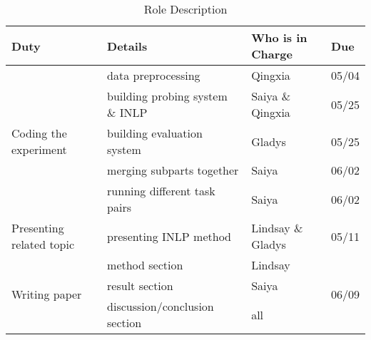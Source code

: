 \documentclass[11pt,a4paper]{article}
\begin{document}
\begin{table*}[h]
    \centering
    \begin{tabular}{llll}
    \hline
    \textbf{Duty} & \textbf{Details} & \textbf{Who is in Charge} &\textbf{Due} \\
    \hline
    \multirow{5}{*}{Coding the experiment} & data preprocessing & Qingxia & 05/04 \\
    & building probing system \& INLP & Saiya \& Qingxia & 05/25 \\
    & building evaluation system & Gladys & 05/25 \\
    & merging subparts together & Saiya & 06/02\\ 
    & running different task pairs & Saiya & 06/02\\
    \hline
    \multirow{2}{*}{Presenting related topic} & \multirow{2}{*}{presenting INLP method} & \multirow{2}{*}{Lindsay \& Gladys} & \multirow{2}{*}{05/11}\\
    & & & \\
    \hline
    \multirow{3}{*}{Writing paper} & method section  & Lindsay & \multirow{3}{*}{06/09}  \\
     & result section & Saiya &  \\
     & discussion/conclusion section & all & \\
    \hline
    \end{tabular}
    \caption{\label{role description} Role Description
    }
    \end{table*}








\end{document}

